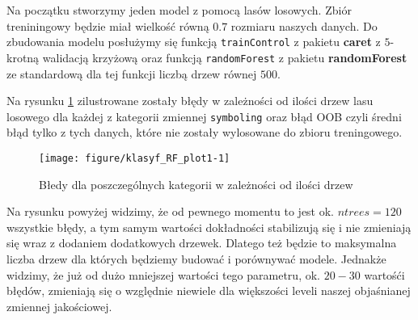 \documentclass[12pt, a4paper]{article}\usepackage[]{graphicx}\usepackage[]{xcolor}
\makeatletter
\def\maxwidth{ %
  \ifdim\Gin@nat@width>\linewidth
    \linewidth
  \else
    \Gin@nat@width
  \fi
}
\newenvironment{knitrout}{}{} %
\makeatother
\begin{document}
Na początku stworzymy jeden model z pomocą lasów losowych. Zbiór treniningowy będzie miał wielkość równą $0.7$ rozmiaru naszych danych. Do zbudowania modelu posłużymy się funkcją \texttt{trainControl} z pakietu \textbf{caret} z $5$-krotną walidacją krzyżową oraz funkcją \texttt{randomForest} z pakietu \textbf{randomForest} ze standardową dla tej funkcji liczbą drzew równej $500$.




Na rysunku \ref{fig:klasyf_RF_plot1} zilustrowane zostały błędy w zależności od ilości drzew lasu losowego dla każdej z kategorii zmiennej \texttt{symboling} oraz błąd OOB czyli średni błąd tylko z tych danych, które nie zostały wylosowane do zbioru treningowego. 
\begin{knitrout}
\color{fgcolor}\begin{figure}[H]

{\centering \texttt{[image: figure/klasyf\_RF\_plot1-1]} 

}

\caption[Błedy dla poszczególnych kategorii w zależności od ilości drzew]{Błedy dla poszczególnych kategorii w zależności od ilości drzew}\label{fig:klasyf_RF_plot1}
\end{figure}

\end{knitrout}

Na rysunku powyżej widzimy, że od pewnego momentu to jest ok. $ntrees=120$ wszystkie błędy, a tym samym wartości dokładności stabilizują się i nie zmieniają się wraz z dodaniem dodatkowych drzewek. Dlatego też będzie to maksymalna liczba drzew dla których będziemy budować i porównywać modele. Jednakże widzimy, że już od dużo mniejszej wartości tego parametru, ok. $20-30$ wartośći błędów, zmieniają się o względnie niewiele dla większości leveli naszej objaśnianej zmiennej jakościowej.
\end{document}
